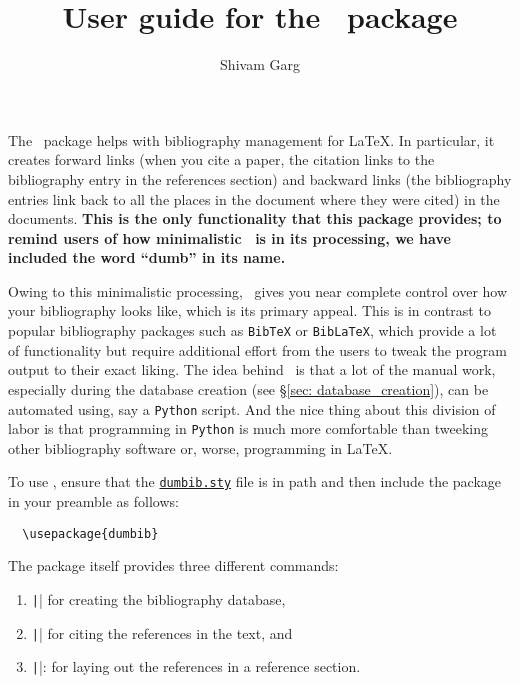 \documentclass[letter, 12pt]{article}
\title{User guide for the \dumbib\ package}
\author{Shivam Garg}
\begin{document}
\maketitle

The \dumbib\ package helps with bibliography management for \LaTeX{}. In particular, it creates forward links (when you cite a paper, the citation links to the bibliography entry in the references section) and backward links (the bibliography entries link back to all the places in the document where they were cited) in the documents. \textbf{This is the only functionality that this package provides; to remind users of how minimalistic \dumbib\ is in its processing, we have included the word ``dumb'' in its name.}

Owing to this minimalistic processing, \dumbib\ gives you near complete control over how your bibliography looks like, which is its primary appeal. This is in contrast to popular bibliography packages such as \texttt{BibTeX} or \texttt{BibLaTeX}, which provide a lot of functionality but require additional effort from the users to tweak the program output to their exact liking. The idea behind \dumbib\ is that a lot of the manual work, especially during the database creation (see \S \ref{sec: database_creation}), can be automated using, say a \texttt{Python} script. And the nice thing about this division of labor is that programming in \texttt{Python} is much more comfortable than tweeking other bibliography software or, worse, programming in \LaTeX{}.

To use \dumbib, ensure that the \href{https://github.com/svmgrg/bibtex_alternative/blob/main/dumbib.sty}{\texttt{dumbib.sty}} file is in path and then include the package in your preamble as follows:
\begin{verbatim}
  \usepackage{dumbib}
\end{verbatim}
The package itself provides three different commands:
\begin{enumerate}
\item \texttt|\dumbibReferenceEntry{}| for creating the bibliography database,
\item \texttt|\cite{}| for citing the references in the text, and
\item \texttt|\dumbibCreateBibliography|: for laying out the references in a reference section.
\end{enumerate}
\end{document}
